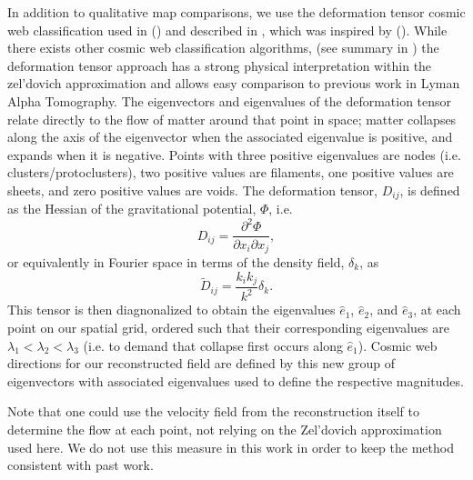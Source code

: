 \documentclass[times]{aastex62}
\begin{document}
In addition to qualitative map comparisons, we use the deformation tensor cosmic web classification used in (\cite{2017Krolewski,2018Krolewski}) and described in \cite{2016LeeWhite}, which was inspired by (\cite{2007Hahn}). While there exists other cosmic web classification algorithms, (see summary in \cite{2014Cautun}) the deformation tensor approach has a strong physical interpretation within the zel'dovich approximation and allows easy comparison to previous work in Lyman Alpha Tomography. The eigenvectors and eigenvalues of the deformation tensor relate directly to the flow of matter around that point in space; matter collapses along the axis of the eigenvector when the associated eigenvalue is positive, and expands when it is negative. Points with three positive eigenvalues are nodes (i.e. clusters/protoclusters), two positive values are filaments, one positive values are sheets, and zero positive values are voids. The deformation tensor, $D_{ij}$, is defined as the Hessian of the gravitational potential, $\Phi$, i.e.
\begin{equation}
    D_{ij} = \frac{\partial^2 \Phi}{\partial x_{i} \partial x_{j}},
    \label{eq:diften}
\end{equation}
or equivalently in Fourier space in terms of the density field, $\delta_k$, as
\begin{equation}
    \tilde{D}_{ij} = \frac{k_i k_j}{k^2}\delta_k.
    \label{eq:diften_k}
\end{equation}
This tensor is then diagnonalized to obtain the eigenvalues $\hat{e}_1$, $\hat{e}_2$, and $\hat{e}_3$, at each point on our spatial grid, ordered such that their corresponding eigenvalues are $\lambda_1<\lambda_2<\lambda_3$ (i.e. to demand that collapse first occurs along $\hat{e}_1$). Cosmic web directions for our reconstructed field are defined by this new group of eigenvectors with associated eigenvalues used to define the respective magnitudes. 

Note that one could use the velocity field from the reconstruction itself to determine the flow at each point, not relying on the Zel'dovich approximation used here. We do not use this measure in this work in order to keep the method consistent with past work.


\end{document}
